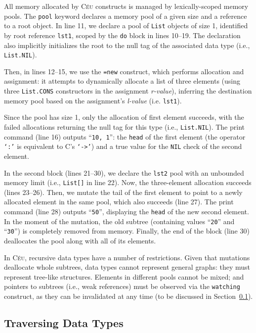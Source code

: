 \documentclass{acm_proc_article-sp}
\newcommand{\CEU}{\textsc{C\'{e}u}\xspace}
\newcommand{\code}[1] {{\small{\texttt{#1}}}}
\begin{document}
All memory allocated by \CEU constructs is managed by lexically-scoped memory
pools. The \code{pool} keyword declares a memory pool of a given size and
a reference to a root object. In line 11, we declare a pool of \code{List}
objects of size 1, identified by root reference \code{lst1},
scoped by the \code{do} block in lines 10--19.
The declaration also implicitly initializes the root to the null tag of the 
associated data type (i.e., \code{List.NIL}).

Then, in lines 12--15, we use the \code{=new} construct, which performs
allocation and assignment: it attempts to dynamically allocate a list of
three elements (using three \code{List.CONS} constructors in the assignment
\emph{r-value}), inferring the destination memory pool based on the 
assignment's \emph{l-value} (i.e. \code{lst1}).

Since the pool has size 1, only the allocation of first element succeeds, with the failed 
allocations returning the null tag for this type (i.e., \code{List.NIL}).
The print command (line 16) outputs ``\texttt{10, 1}'': the \code{head} of the 
first element (the operator \code{`:'} is equivalent to C's \code{`->'}) and 
a true value for the \code{NIL} check of the second element.

In the second block (lines 21--30), we declare the \code{lst2} pool with an
unbounded memory limit (i.e., \code{List[]} in line 22).
Now, the three-element allocation succeeds (lines 23--26).
Then, we mutate the tail of the first element to point to a newly allocated 
element in the same pool, which also succeeds (line 27).
The print command (line 28) outputs ``\texttt{50}'', displaying the \code{head}
of the new second element.
In the moment of the mutation, the old subtree (containing values  ``\texttt{20}''
and  ``\texttt{30}'') is completely removed from memory.
Finally, the end of the block (line 30) deallocates the pool along with all of 
its elements.


In \CEU, recursive data types have a number of restrictions.
Given that mutations deallocate whole subtrees, data types cannot represent 
general graphs: they must represent tree-like structures.
Elements in different pools cannot be mixed;
and pointers to subtrees (i.e., weak references) must be observed via the
\code{watching} construct, as they can be invalidated at any time
(to be discussed in Section~\ref{sec.traverse}).

\subsection{Traversing Data Types}
\label{sec.traverse}
\end{document}
